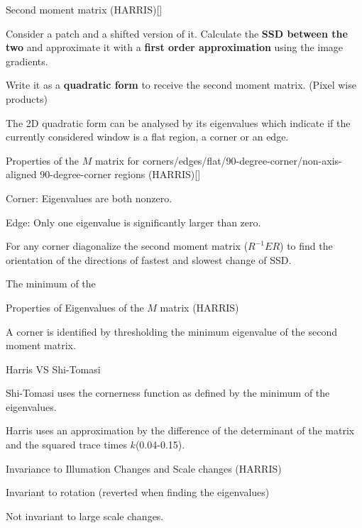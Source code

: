 \documentclass[10pt,a4paper]{scrartcl}
\begin{document}
\begin{multicols*}{2}
\begin{QandA}{Second moment matrix (HARRIS)}[\Derivation]
\item Consider a patch and a shifted version of it. Calculate the \textbf{SSD between the two} and approximate it with a \textbf{first order approximation} using the image gradients.
\item Write it as a \textbf{quadratic form} to receive the second moment matrix. (Pixel wise products)
\item The 2D quadratic form can be analysed by its eigenvalues which indicate if the currently considered window is a flat region, a corner or an edge.
\end{QandA}

\begin{QandA}{Properties of the $M$ matrix for corners/edges/flat/90-degree-corner/non-axis-aligned 90-degree-corner regions (HARRIS)}[\Derivation]
\item Corner: Eigenvalues are both nonzero.
\item Edge: Only one eigenvalue is significantly larger than zero.
\item For any corner diagonalize the second moment matrix ($R^{-1}ER$) to find the orientation of the directions of fastest and slowest change of SSD.
\item The minimum of the  
\end{QandA}

\begin{QandA}{Properties of Eigenvalues of the $M$ matrix (HARRIS)}
\item A corner is identified by thresholding the minimum eigenvalue of the second moment matrix. 
\end{QandA}

\begin{QandA}{Harris VS Shi-Tomasi}
\item Shi-Tomasi uses the cornerness function as defined by the minimum of the eigenvalues. 

\item Harris uses an approximation by the difference of the determinant of the matrix and the squared trace times $k$(0.04-0.15).

\end{QandA}

\begin{QandA}{Invariance to Illumation Changes and Scale changes (HARRIS)}
\item Invariant to rotation (reverted when finding the eigenvalues)
\item Not invariant to large scale changes.
\end{QandA}


\end{multicols*}
\end{document}
